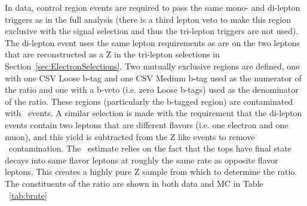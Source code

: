 In data, control region events are required to pass the same mono- and di-lepton triggers as in the full analysis (there is a third lepton veto to make this region exclusive with the signal selection and thus the tri-lepton triggers are not used). The di-lepton event uses the same lepton requirements as are on the two leptons that are reconstructed as a Z in the tri-lepton selections in Section~\ref{sec:ElectronSelections}. Two mutually exclusive regions are defined, one with one CSV Loose b-tag and one CSV Medium b-tag used as the numerator of the ratio and one with a b-veto (i.e. zero Loose b-tags) used as the denominator of the ratio. These regions (particularly the b-tagged region) are contaminated with \ttbar \ events. A similar selection is made with the requirement that the di-lepton events contain two leptons that are different flavors (i.e. one electron and one muon), and this yield is subtracted from the Z like events to remove \ttbar \ contamination. The \ttbar \ estimate relies on the fact that the tops have final state decays into same flavor leptons at roughly the same rate as opposite flavor leptons. This creates a highly pure Z sample from which to determine the ratio. The constituents of the ratio are shown in both data and MC in Table ~\ref{tab:brate}

